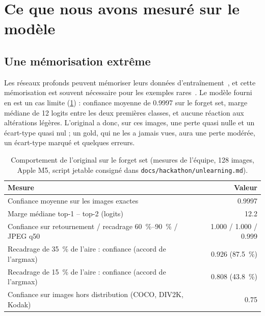 \documentclass[11pt,a4paper]{article}
\newcommand{\chemin}[1]{\nolinkurl{#1}}%
\begin{document}
\section{Ce que nous avons mesuré sur le modèle}\label{sec:mesures}

\subsection{Une mémorisation extrême}
Les réseaux profonds peuvent mémoriser leurs données d'entraînement~\cite{zhang2017}, et cette
mémorisation est souvent nécessaire pour les exemples rares~\cite{feldman2020}. Le modèle fourni
en est un cas limite (\cref{tab:memo}) : confiance moyenne de \num{0.9997} sur le forget set, marge
médiane de 12 logits entre les deux premières classes, et aucune réaction aux altérations
légères. L'original a donc, sur ces images, une perte quasi nulle et un écart-type quasi nul ; un
gold, qui ne les a jamais vues, aura une perte modérée, un écart-type marqué et quelques erreurs.

\begin{table}[ht]
  \centering\small
  \caption{Comportement de l'original sur le forget set (mesures de l'équipe, 128 images, Apple
  M5, script jetable consigné dans \chemin{docs/hackathon/unlearning.md}).}\label{tab:memo}
  \begin{tabular}{@{}p{9.4cm}r@{}}
    \toprule
    Mesure & Valeur\\
    \midrule
    Confiance moyenne sur les images exactes & \num{0.9997}\\
    Marge médiane top-1 -- top-2 (logits) & \num{12.2}\\
    Confiance sur retournement / recadrage \SIrange{60}{90}{\percent} / JPEG q50 & \num{1.000} / \num{1.000} / \num{0.999}\\
    Recadrage de \SI{35}{\percent} de l'aire : confiance (accord de l'argmax) & \num{0.926} (\SI{87.5}{\percent})\\
    Recadrage de \SI{15}{\percent} de l'aire : confiance (accord de l'argmax) & \num{0.808} (\SI{43.8}{\percent})\\
    Confiance sur images hors distribution (COCO, DIV2K, Kodak) & \num{0.75}\\
    \bottomrule
  \end{tabular}
\end{table}
\end{document}
